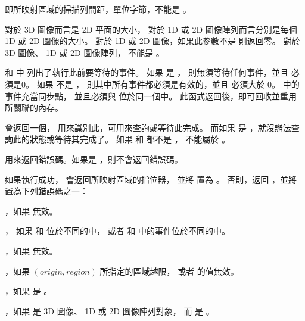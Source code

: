 即所映射區域的掃描列間距，單位字節，不能是 。

 對於 3D 圖像而言是 2D 平面的大小，
對於 1D 或 2D 圖像陣列而言分別是每個 1D 或 2D 圖像的大小。
對於 1D 或 2D 圖像，如果此參數不是  則返回零。
對於 3D 圖像、 1D 或 2D 圖像陣列，  不能是 。

 和  中
列出了執行此前要等待的事件。
如果  是 ，
則無須等待任何事件，並且  必須是0。
如果  不是 ，
則其中所有事件都必須是有效的，並且  必須大於 0。
 中的事件充當同步點，
並且必須與  位於同一個中。
此函式返回後，即可回收並重用  所關聯的內存。

 會返回一個，
用來識別此，可用來查詢或等待此完成。
而如果  是 ，就沒辦法查詢此的狀態或等待其完成了。
如果  和  都不是 ，
 不能屬於 。

 用來返回錯誤碼。如果是 ，則不會返回錯誤碼。

如果執行成功，  會返回所映射區域的指位器，
並將  置為 。
否則，返回 ，並將  置為下列錯誤碼之一：
\startigBase
\item {}，如果  無效。

\item {}，
如果  和  位於不同的中，
或者  和  中的事件位於不同的中。

\item {}，如果  無效。

\item {}，如果 $(origin, region)$ 所指定的區域越限，
或者  的值無效。

\item {}，如果  是 。

\item {}，如果  是 3D 圖像、 1D 或 2D 圖像陣列對象，
而  是 。

